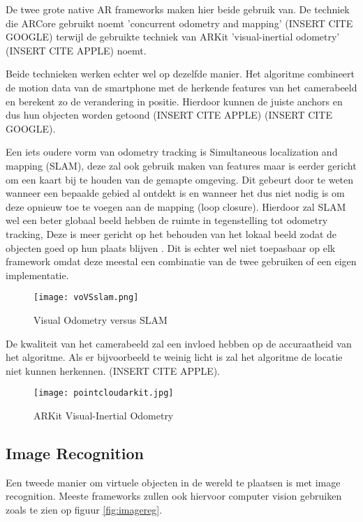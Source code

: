 De twee grote native AR frameworks maken hier beide gebruik van. De techniek die ARCore gebruikt noemt 'concurrent odometry and mapping' (INSERT CITE GOOGLE) terwijl de gebruikte techniek van ARKit 'visual-inertial odometry' (INSERT CITE APPLE) noemt. 

Beide technieken werken echter wel op dezelfde manier. Het algoritme combineert de motion data van de smartphone met de herkende features van het camerabeeld en berekent zo de verandering in positie. Hierdoor kunnen de juiste anchors en dus hun objecten worden getoond (INSERT CITE APPLE) (INSERT CITE GOOGLE).

Een iets oudere vorm van odometry tracking is Simultaneous localization and mapping (SLAM), deze zal ook gebruik maken van features maar is eerder gericht om een kaart bij te houden van de gemapte omgeving. Dit gebeurt door te weten wanneer een bepaalde gebied al ontdekt is en wanneer het dus niet nodig is om deze opnieuw toe te voegen aan de mapping (loop closure). Hierdoor zal SLAM wel een beter globaal beeld hebben de ruimte in tegenstelling tot odometry tracking, Deze is meer gericht op het behouden van het lokaal beeld zodat de objecten goed op hun plaats blijven \autocite{Yousif2015}. Dit is echter wel niet toepasbaar op elk framework omdat deze meestal een combinatie van de twee gebruiken of een eigen implementatie.

\begin{figure}
    \texttt{[image: voVSslam.png]}
    \caption{Visual Odometry versus SLAM \autocite{Yousif2015}}
    \label{fig:voVSslam}
\end{figure}


De kwaliteit van het camerabeeld zal een invloed hebben op de accuraatheid van het algoritme. Als er bijvoorbeeld te weinig licht is zal het algoritme de locatie niet kunnen herkennen. (INSERT CITE APPLE).

\begin{figure}
    \texttt{[image: pointcloudarkit.jpg]}
    \caption{ARKit Visual-Inertial Odometry}
    \label{fig:pointcloudarkit}
\end{figure}


\subsection{Image Recognition}
Een tweede manier om virtuele objecten in de wereld te plaatsen is met image recognition. Meeste frameworks zullen ook hiervoor computer vision gebruiken zoals te zien op figuur \ref{fig:imagereg}.

